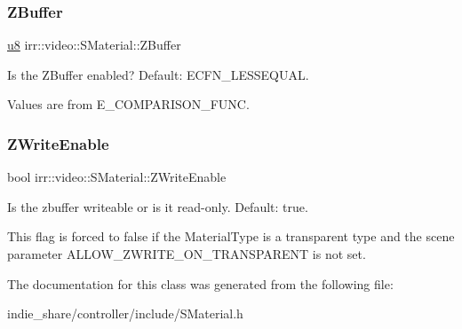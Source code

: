 \subsubsection{\texorpdfstring{Z\+Buffer}{ZBuffer}}
{\footnotesize\ttfamily \hyperlink{namespaceirr_a646874f69af8ff87fc10201b0254a761}{u8} irr\+::video\+::\+S\+Material\+::\+Z\+Buffer}



Is the Z\+Buffer enabled? Default\+: E\+C\+F\+N\+\_\+\+L\+E\+S\+S\+E\+Q\+U\+AL. 

Values are from E\+\_\+\+C\+O\+M\+P\+A\+R\+I\+S\+O\+N\+\_\+\+F\+U\+NC. \mbox{\label{classirr_1_1video_1_1SMaterial_a0e6b40e87162a74f2c730af597e20721}} 
\subsubsection{\texorpdfstring{Z\+Write\+Enable}{ZWriteEnable}}
{\footnotesize\ttfamily bool irr\+::video\+::\+S\+Material\+::\+Z\+Write\+Enable}



Is the zbuffer writeable or is it read-\/only. Default\+: true. 

This flag is forced to false if the Material\+Type is a transparent type and the scene parameter A\+L\+L\+O\+W\+\_\+\+Z\+W\+R\+I\+T\+E\+\_\+\+O\+N\+\_\+\+T\+R\+A\+N\+S\+P\+A\+R\+E\+NT is not set. 

The documentation for this class was generated from the following file\+:\begin{DoxyCompactItemize}
\item 
indie\+\_\+share/controller/include/S\+Material.\+h\end{DoxyCompactItemize}
